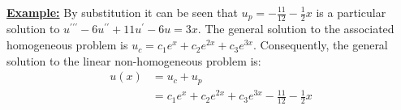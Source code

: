 \vspace{0.25cm}

\noindent\textbf{\underline{Example:}} By substitution it can be seen that $u_p = -\frac{11}{12}-\frac{1}{2}x$ is a particular solution to $u^{\prime \prime \prime}-6u^{\prime \prime} + 11u^{\prime} - 6u=3x$.  The general solution to the associated homogeneous problem is $u_c = c_1e^{x}+c_2e^{2x}+c_3e^{3x}$.  Consequently, the general solution to the linear non-homogeneous problem is:
\begin{align*}
u(x) &= u_c + u_p \\
&=c_1e^{x}+c_2e^{2x}+c_3e^{3x}-\frac{11}{12}-\frac{1}{2}x
\end{align*}

